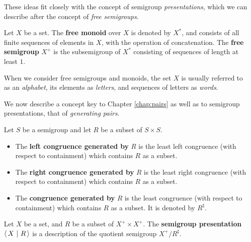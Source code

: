These ideas fit closely with the concept of semigroup \textit{presentations},
which we can describe after the concept of \textit{free semigroups}.

\begin{definition}
  \label{def:free}
  Let $X$ be a set.  The \textbf{free monoid} over $X$ is denoted by $X^*$, and
  consists of all finite sequences of elements in $X$, with the operation of
  concatenation.  The \textbf{free semigroup} $X^+$ is the subsemigroup of $X^*$
  consisting of sequences of length at least $1$.
\end{definition}

When we consider free semigroups and monoids, the set $X$ is usually referred to
as an \textit{alphabet}, its elements as \textit{letters}, and sequences of
letters as \textit{words}.

We now describe a concept key to Chapter \ref{chap:pairs} as well as to
semigroup presentations, that of \textit{generating pairs}.

\begin{definition}
  \label{def:gen-pairs}
  Let $S$ be a semigroup and let $R$ be a subset of $S \times S$.
  \begin{itemize}
  \item
    The \textbf{left congruence generated by} $R$ is the least left congruence
    (with respect to containment) which contains $R$ as a subset.
  \item
    The \textbf{right congruence generated by} $R$ is the least right congruence
    (with respect to containment) which contains $R$ as a subset.
  \item
    The \textbf{congruence generated by} $R$ is the least congruence
    (with respect to containment) which contains $R$ as a subset.  It is denoted
    by $R^\sharp$.
  \end{itemize}
\end{definition}

\begin{definition}
  \label{def:presentation}
  Let $X$ be a set, and $R$ be a subset of $X^+ \times X^+$.  The
  \textbf{semigroup presentation} $\left\langle\,X ~\middle|~ R\,\right\rangle$ is a description of the quotient
  semigroup $X^+ / R^\sharp$.
\end{definition}
